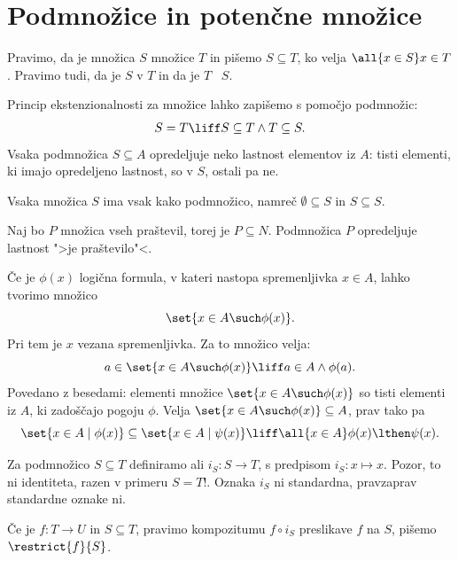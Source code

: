 \chapter{Podmnožice in potenčne množice}

Pravimo, da je množica $S$  množice $T$ in pišemo $S \subseteq T$, ko velja $\all{x \in S} x \in T$. Pravimo tudi, da je $S$  v $T$ in da je $T$ ~$S$.

Princip ekstenzionalnosti za množice lahko zapišemo s pomočjo podmnožic:
%
\begin{equation*}
  S = T \liff S \subseteq T \land T \subseteq S.
\end{equation*}
%
Vsaka podmnožica $S \subseteq A$ opredeljuje neko lastnost elementov iz $A$: tisti
elementi, ki imajo opredeljeno lastnost, so v $S$, ostali pa ne.

Vsaka množica $S$ ima vsak kako podmnožico, namreč $\emptyset \subseteq S$ in $S \subseteq S$.

\begin{zgled}
  Naj bo $P$ množica vseh praštevil, torej je $P \subseteq N$. Podmnožica $P$
  opredeljuje lastnost ">je praštevilo"<.
\end{zgled}


Če je $\phi(x)$ logična formula, v kateri nastopa spremenljivka $x \in A$, lahko tvorimo množico
%
\begin{equation*}
    \set{ x \in A \such \phi(x) }.
\end{equation*}
%
Pri tem je $x$ vezana spremenljivka. Za to množico velja:
%
\begin{equation*}
    a \in \set{ x \in A \such \phi(x) } \liff a \in A \land \phi(a).
\end{equation*}
%
Povedano z besedami: elementi množice $\set{ x \in A \such \phi(x) }$ so tisti elementi iz $A$, ki zadoščajo pogoju $\phi$.
%
Velja $\set{ x \in A \such \phi(x) } \subseteq A$, prav tako pa
\begin{equation*}
  \set{x \in A \mid \phi(x)} \subseteq \set{x \in A \mid \psi(x)} \liff
  \all{x \in A} \phi(x) \lthen \psi(x).
\end{equation*}

Za podmnožico $S \subseteq T$ definiramo  ali  $i_S : S \to T$, s predpisom $i_S : x \mapsto x$. Pozor, to ni identiteta, razen v primeru $S = T$!.
Oznaka $i_S$ ni standardna, pravzaprav standardne oznake ni.

Če je $f : T \to U$ in $S \subseteq T$, pravimo kompozitumu $f \circ i_S$  preslikave $f$ na $S$, pišemo $\restrict{f}{S}$.


